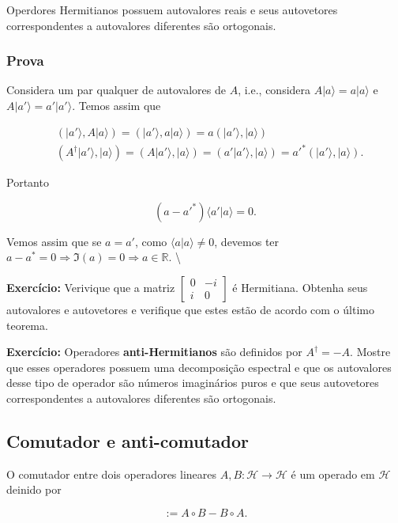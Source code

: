 \documentclass[11pt]{article}
\begin{document}
Operdores Hermitianos possuem autovalores reais e seus autovetores
correspondentes a autovalores diferentes são ortogonais.

\subsubsection{Prova}\label{prova}

Considera um par qualquer de autovalores de \(A\), i.e., considera
\(A|a\rangle=a|a\rangle\) e \(A|a'\rangle=a'|a'\rangle\). Temos assim
que

\begin{align}
& (|a'\rangle,A|a\rangle) = (|a'\rangle,a|a\rangle) = a(|a'\rangle,|a\rangle) \\
& (A^{\dagger}|a'\rangle,|a\rangle)=(A|a'\rangle,|a\rangle) = (a'|a'\rangle,|a\rangle) = a'^{*}(|a'\rangle,|a\rangle).
\end{align}

Portanto

\begin{equation}
(a-a'^{*})\langle a'|a\rangle=0.
\end{equation}

Vemos assim que se \(a=a'\), como \(\langle a|a\rangle\ne 0\), devemos
ter \(a-a^{*}=0\Rightarrow \Im(a)=0\Rightarrow a\in\mathbb{R}\).
\textbackslash{}

\textbf{Exercício:} Verivique que a matriz
\(\begin{bmatrix} 0&-i\\i&0 \end{bmatrix}\) é Hermitiana. Obtenha seus
autovalores e autovetores e verifique que estes estão de acordo com o
último teorema.

\textbf{Exercício:} Operadores \textbf{anti-Hermitianos} são definidos
por \(A^{\dagger}=-A\). Mostre que esses operadores possuem uma
decomposição espectral e que os autovalores desse tipo de operador são
números imaginários puros e que seus autovetores correspondentes a
autovalores diferentes são ortogonais.

    \subsection{Comutador e
anti-comutador}\label{comutador-e-anti-comutador}

O comutador entre dois operadores lineares
\(A,B:\mathcal{H}\rightarrow\mathcal{H}\) é um operado em
\(\mathcal{H}\) deinido por

\begin{equation}
[A,B] := A\circ B - B\circ A.
\end{equation}
\end{document}
